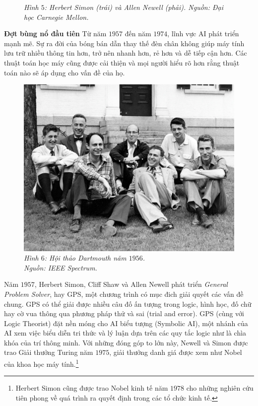 \begin{multicols}{2}
\begin{figure}[H]
		\caption{\small\textit{\color{cackithi}Hình $5$: Herbert Simon (trái) và Allen Newell (phải). Nguồn: Đại học Carnegie Mellon.}}
		\vspace*{-10pt}
	\end{figure}
	\textbf{\color{cackithi}Đợt bùng nổ đầu tiên}
	\vskip 0.1cm
	Từ năm $1957$ đến năm $1974$, lĩnh vực AI phát triển mạnh mẽ. Sự ra đời của bóng bán dẫn thay thế đèn chân không giúp máy tính lưu trữ nhiều thông tin hơn, trở nên nhanh hơn, rẻ hơn và dễ tiếp cận hơn. Các thuật toán học máy cũng được cải thiện và mọi người hiểu rõ hơn rằng thuật toán nào sẽ áp dụng cho vấn đề của họ.
	\begin{figure}[H]
		\vspace*{5pt}
		\centering
		\captionsetup{labelformat= empty, justification=centering}
		\includegraphics[width= 1\linewidth]{Dartmouth.jpg}
		\caption{\small\textit{\color{cackithi}Hình $6$: Hội thảo Dartmouth năm $1956$.\\ Nguồn: IEEE Spectrum.}}
		\vspace*{-10pt}
	\end{figure}
	Năm $1957$, Herbert Simon, Cliff Shaw và Allen Newell phát triển \textit{General Problem Solver}, hay GPS, một chương trình có mục đich giải quyết các vấn đề chung. GPS có thể giải được nhiều câu đố ấn tượng trong logic, hình học, đố chữ hay cờ vua thông qua phương pháp thử và sai (trial and error). GPS (cùng với Logic Theorist) đặt nền móng cho AI biểu tượng (Symbolic AI), một nhánh của AI xem việc biểu diễn tri thức và lý luận dựa trên các quy tắc logic như là chìa khóa của trí thông minh. Với những đóng góp to lớn này, Newell và Simon được trao Giải thưởng Turing năm $1975$, giải thưởng danh giá được xem như Nobel của khoa học máy tính.\footnote{\color{cackithi}Herbert Simon cũng được trao Nobel kinh tế năm $1978$ cho những nghiên cứu tiên phong về quá trình ra quyết định trong các tổ chức kinh tế.}

\end{multicols}
